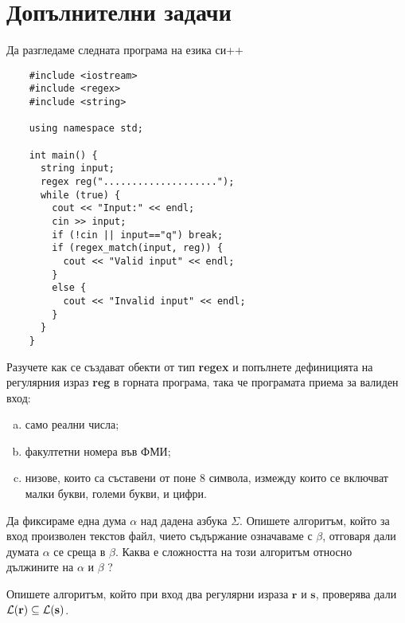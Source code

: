 \section{Допълнителни задачи}

\begin{problem}
  Да разгледаме следната програма на езика си++
  \begin{verbatim}
    #include <iostream>
    #include <regex>
    #include <string>
    
    using namespace std;
    
    int main() {
      string input;
      regex reg("....................");
      while (true) {
        cout << "Input:" << endl;
        cin >> input;
        if (!cin || input=="q") break;
        if (regex_match(input, reg)) {
          cout << "Valid input" << endl;
        }  
        else {
          cout << "Invalid input" << endl;
        }
      }
    }
  \end{verbatim}
  Разучете как се създават обекти от тип {\bf regex} и попълнете дефиницията на регулярния израз {\bf reg} в горната програма, така че програмата приема за валиден вход:
  \begin{enumerate}[a)]
  \item 
    само реални числа;
  \item
    факултетни номера във ФМИ;
  \item
    низове, които са съставени от поне 8 символа, измежду които се включват малки букви, големи букви,
    и цифри.    
  \end{enumerate}
\end{problem}

\begin{problem}
  Да фиксираме една дума $\alpha$ над дадена азбука $\Sigma$.
  Опишете алгоритъм, който за вход произволен текстов файл, чието съдържание означаваме с $\beta$,
  отговаря дали думата $\alpha$ се среща в $\beta$.
  Каква е сложността на този алгоритъм относно дължините на $\alpha$ и $\beta$ ?
\end{problem}

\begin{problem}
  Опишете алгоритъм, който при вход два регулярни израза $\mathbf{r}$ и $\mathbf{s}$,
  проверява дали $\mathcal{L}(\mathbf{r}) \subseteq \mathcal{L}(\mathbf{s})$.
\end{problem}


